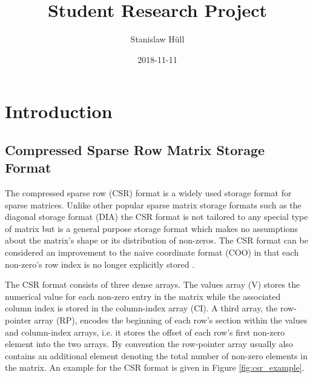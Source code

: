 \documentclass{article}
\author{Stanislaw Hüll}
\title{Student Research Project}
\date{2018-11-11}
\begin{document}
\maketitle

\section{Introduction}

  \subsection{Compressed Sparse Row Matrix Storage Format}

    The compressed sparse row (CSR) format is a widely used storage format for sparse matrices. Unlike other popular sparse matrix storage formats such as the diagonal storage format (DIA) the CSR format is not tailored to any special type of matrix but is a general purpose storage format which makes no assumptions about the matrix's shape or its distribution of non-zeros. The CSR format can be considered an improvement to the naive coordinate format (COO) in that each non-zero's row index is no longer explicitly stored \cite{Bell2011}.

    The CSR format consists of three dense arrays. The values array (V) stores the numerical value for each non-zero entry in the matrix while the associated column index is stored in the column-index array (CI). A third array, the row-pointer array (RP), encodes the beginning of each row's section within the values and column-index arrays, i.e. it stores the offset of each row's first non-zero element into the two arrays. By convention the row-pointer array usually also contains an additional element denoting the total number of non-zero elements in the matrix. An example for the CSR format is given in Figure \ref{fig:csr_example}.
\end{document}
